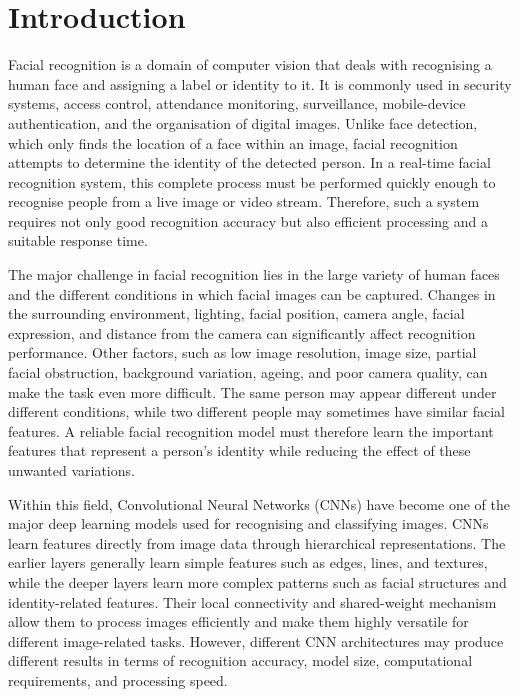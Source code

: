 \documentclass[11pt,a4paper,twocolumn]{article}
\begin{document}

\section{Introduction}

Facial recognition is a domain of computer vision that deals with recognising a human face and assigning a label or identity to it. It is commonly used in security systems, access control, attendance monitoring, surveillance, mobile-device authentication, and the organisation of digital images. Unlike face detection, which only finds the location of a face within an image, facial recognition attempts to determine the identity of the detected person. In a real-time facial recognition system, this complete process must be performed quickly enough to recognise people from a live image or video stream. Therefore, such a system requires not only good recognition accuracy but also efficient processing and a suitable response time.

The major challenge in facial recognition lies in the large variety of human faces and the different conditions in which facial images can be captured. Changes in the surrounding environment, lighting, facial position, camera angle, facial expression, and distance from the camera can significantly affect recognition performance. Other factors, such as low image resolution, image size, partial facial obstruction, background variation, ageing, and poor camera quality, can make the task even more difficult. The same person may appear different under different conditions, while two different people may sometimes have similar facial features. A reliable facial recognition model must therefore learn the important features that represent a person's identity while reducing the effect of these unwanted variations.

Within this field, Convolutional Neural Networks (CNNs) have become one of the major deep learning models used for recognising and classifying images. CNNs learn features directly from image data through hierarchical representations. The earlier layers generally learn simple features such as edges, lines, and textures, while the deeper layers learn more complex patterns such as facial structures and identity-related features. Their local connectivity and shared-weight mechanism allow them to process images efficiently and make them highly versatile for different image-related tasks. However, different CNN architectures may produce different results in terms of recognition accuracy, model size, computational requirements, and processing speed.
\end{document}
